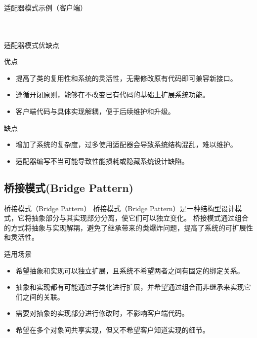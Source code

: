\documentclass[UTF8,aspectratio=169]{beamer}
\begin{document}
\begin{frame}{适配器模式示例（客户端）}
    \begin{columns}
        \begin{column}{0.48\textwidth}
            \inputminted[firstline=77, lastline=96]{cpp}{code/adapter_pattern.cpp}
        \end{column}
        \begin{column}{0.48\textwidth}
            \inputminted[firstline=98, lastline=118]{cpp}{code/adapter_pattern.cpp}
        \end{column}
    \end{columns}
\end{frame}

\begin{frame}{适配器模式优缺点}
    \begin{ytublock}{优点}
        \begin{itemize}
            \item 提高了类的复用性和系统的灵活性，无需修改原有代码即可兼容新接口。
            \item 遵循开闭原则，能够在不改变已有代码的基础上扩展系统功能。
            \item 客户端代码与具体实现解耦，便于后续维护和升级。
        \end{itemize}
    \end{ytublock}
    \begin{alertytublock}{缺点}
        \begin{itemize}
            \item 增加了系统的复杂度，过多使用适配器会导致系统结构混乱，难以维护。
            \item 适配器编写不当可能导致性能损耗或隐藏系统设计缺陷。
        \end{itemize}
    \end{alertytublock}
\end{frame}

\subsection{桥接模式(Bridge Pattern)}

\begin{frame}{桥接模式（Bridge Pattern）}
    桥接模式（Bridge Pattern）是一种结构型设计模式，它将抽象部分与其实现部分分离，使它们可以独立变化。
    桥接模式通过组合的方式将抽象与实现解耦，避免了继承带来的类爆炸问题，提高了系统的可扩展性和灵活性。
    \begin{ytublock}{适用场景}
        \begin{itemize}
            \item 希望抽象和实现可以独立扩展，且系统不希望两者之间有固定的绑定关系。
            \item 抽象和实现都有可能通过子类化进行扩展，并希望通过组合而非继承来实现它们之间的关联。
            \item 需要对抽象的实现部分进行修改时，不影响客户端代码。
            \item 希望在多个对象间共享实现，但又不希望客户知道实现的细节。
        \end{itemize}
    \end{ytublock}
\end{frame}
\end{document}
